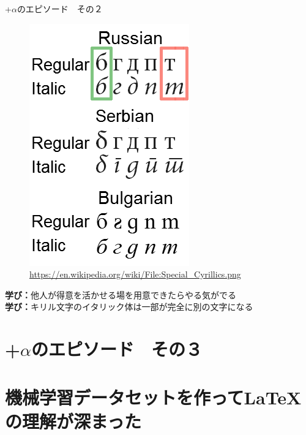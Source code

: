 \documentclass[lualatex,aspectratio=169]{beamer}
\begin{document}
\begin{frame}[t]{+$\alpha$のエピソード　その２}
\begin{figure}
\begin{overprint}
            \begin{center}\includegraphics[height=0.4\textheight]{./img/cyr_italics_marked.png}\\{\tiny\url{https://en.wikipedia.org/wiki/File:Special_Cyrillics.png}}\end{center}
        \end{overprint}
    \end{figure}
    \textbf{学び：}他人が得意を活かせる場を用意できたらやる気がでる\\
 	\onslide<8->\textbf{学び：}キリル文字のイタリック体は一部が完全に別の文字になる
\end{frame}

\section{+$\alpha$のエピソード　その３}

\section{機械学習データセットを作って\LaTeX{}の理解が深まった}
\end{document}
